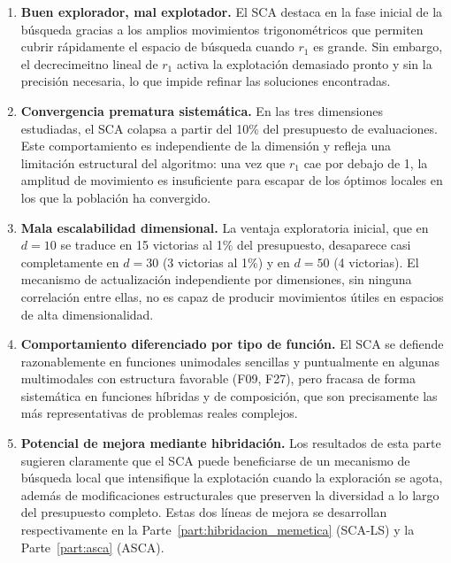 \documentclass[12pt,a4paper]{article}
\begin{document}
\begin{enumerate}
    \item \textbf{Buen explorador, mal explotador.} El SCA destaca en la fase inicial de la búsqueda gracias a los amplios movimientos trigonométricos que permiten cubrir rápidamente el espacio de búsqueda cuando $r_1$ es grande. Sin embargo, el decrecimeitno lineal de $r_1$ activa la explotación demasiado pronto y sin la precisión necesaria, lo que impide refinar las soluciones encontradas.

    \item \textbf{Convergencia prematura sistemática.} En las tres dimensiones estudiadas, el SCA colapsa a partir del 10\% del presupuesto de evaluaciones. Este comportamiento es independiente de la dimensión y refleja una limitación estructural del algoritmo: una vez que $r_1$ cae por debajo de 1, la amplitud de movimiento es insuficiente para escapar de los óptimos locales en los que la población ha convergido.

    \item \textbf{Mala escalabilidad dimensional.} La ventaja exploratoria inicial, que en $d=10$ se traduce en 15 victorias al 1\% del presupuesto, desaparece casi completamente en $d=30$ (3 victorias al 1\%) y en $d=50$ (4 victorias). El mecanismo de actualización independiente por dimensiones, sin ninguna correlación entre ellas, no es capaz de producir movimientos útiles en espacios de alta dimensionalidad.

    \item \textbf{Comportamiento diferenciado por tipo de función.} El SCA se defiende razonablemente en funciones unimodales sencillas y puntualmente en algunas multimodales con estructura favorable (F09, F27), pero fracasa de forma sistemática en funciones híbridas y de composición, que son precisamente las más representativas de problemas reales complejos.

    \item \textbf{Potencial de mejora mediante hibridación.} Los resultados de esta parte sugieren claramente que el SCA puede beneficiarse de un mecanismo de búsqueda local que intensifique la explotación cuando la exploración se agota, además de modificaciones estructurales que preserven la diversidad a lo largo del presupuesto completo. Estas dos líneas de mejora se desarrollan respectivamente en la Parte~\ref{part:hibridacion_memetica} (SCA-LS) y la Parte~\ref{part:asca} (ASCA).
\end{enumerate}

\clearpage
\end{document}
